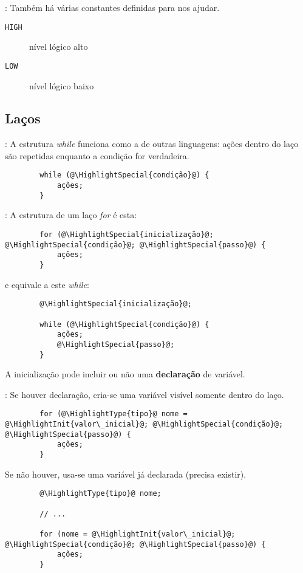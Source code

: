\begin{frame}{\insertsection: \insertsubsection}
	Também há várias constantes definidas para nos ajudar.
	\begin{description}
		\item[\texttt{HIGH}] nível lógico alto
		\item[\texttt{LOW}] nível lógico baixo
	\end{description}
\end{frame}


\subsection{Laços}


\begin{frame}[fragile]{\insertsection: \insertsubsection}
	A estrutura \textit{while} funciona como a de outras linguagens: ações dentro do laço são repetidas enquanto a condição for verdadeira.
	\begin{verbatim}
		while (@\HighlightSpecial{condição}@) {
			ações;
		}
	\end{verbatim}
\end{frame}


\begin{frame}[fragile]{\insertsection: \insertsubsection}
	A estrutura de um laço \textit{for} é esta:
	\begin{verbatim}
		for (@\HighlightSpecial{inicialização}@; @\HighlightSpecial{condição}@; @\HighlightSpecial{passo}@) {
			ações;
		}
	\end{verbatim}
	e equivale a este \textit{while}:
	\begin{verbatim}
		@\HighlightSpecial{inicialização}@;

		while (@\HighlightSpecial{condição}@) {
			ações;
			@\HighlightSpecial{passo}@;
		}
	\end{verbatim}

	A inicialização pode incluir ou não uma \textbf{declaração} de variável.
\end{frame}


\begin{frame}[fragile]{\insertsection: \insertsubsection}
	Se houver declaração, cria-se uma variável visível somente dentro do laço.
	\begin{verbatim}
		for (@\HighlightType{tipo}@ nome = @\HighlightInit{valor\_inicial}@; @\HighlightSpecial{condição}@; @\HighlightSpecial{passo}@) {
			ações;
		}
	\end{verbatim}

	Se não houver, usa-se uma variável já declarada (precisa existir).
	\begin{verbatim}
		@\HighlightType{tipo}@ nome;

		// ...

		for (nome = @\HighlightInit{valor\_inicial}@; @\HighlightSpecial{condição}@; @\HighlightSpecial{passo}@) {
			ações;
		}
	\end{verbatim}
\end{frame}


